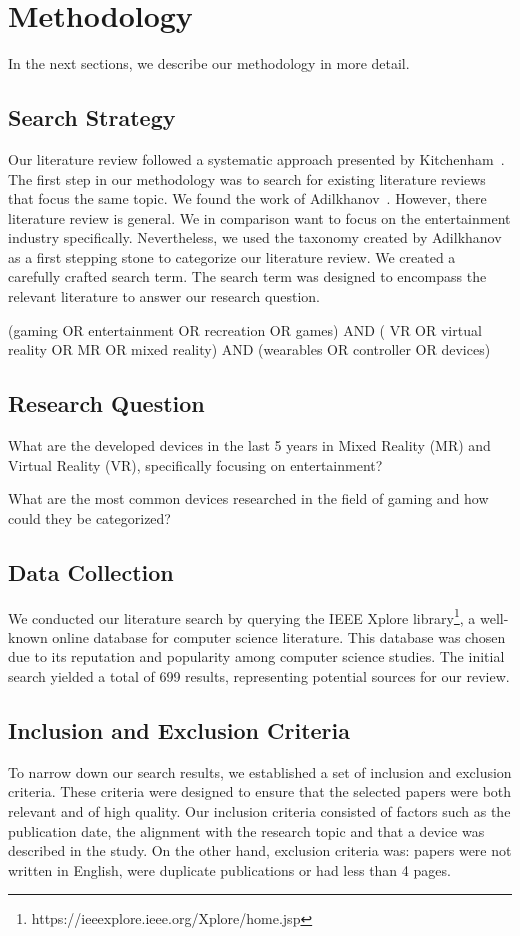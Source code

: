 \section{Methodology}
\label{sec:method}
In the next sections, we describe our methodology in more detail.

\subsection{Search Strategy}

Our literature review followed a systematic approach presented by Kitchenham~\cite{Kitchenham06}. The first step in our methodology was to search for existing literature reviews that focus the same topic. We found the work of Adilkhanov~\cite{Adilkhanov22}. However, there literature review is general. We in comparison want to focus on the entertainment industry specifically. Nevertheless, we used the taxonomy created by Adilkhanov as a first stepping stone to categorize our literature review. We created a carefully crafted search term. The search term was designed to encompass the relevant literature to answer our research question.

(gaming OR entertainment OR recreation OR games) AND ( VR OR virtual reality OR MR OR mixed reality) AND (wearables OR controller OR devices)


\subsection{Research Question}
What are the developed devices in the last 5 years in Mixed Reality (MR) and Virtual Reality (VR), specifically focusing on entertainment? 

What are the most common devices researched in the field of gaming and how could they be categorized?

\subsection{Data Collection}
We conducted our literature search by querying the IEEE Xplore library\footnote{https://ieeexplore.ieee.org/Xplore/home.jsp}, a well-known online database for computer science literature. This database was chosen due to its reputation and popularity among computer science studies. The initial search yielded a total of 699 results, representing potential sources for our review.

\subsection{Inclusion and Exclusion Criteria}
To narrow down our search results, we established a set of inclusion and exclusion criteria. These criteria were designed to ensure that the selected papers were both relevant and of high quality. Our inclusion criteria consisted of factors such as the publication date, the alignment with the research topic and that a device was described in the study. On the other hand, exclusion criteria was: papers were not written in English, were duplicate publications or had less than 4 pages.


